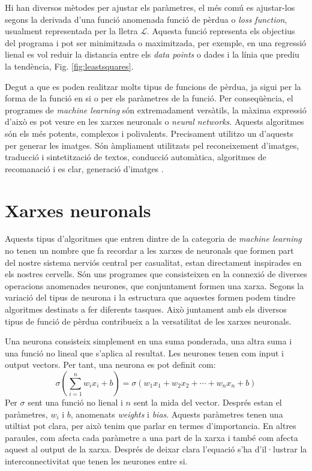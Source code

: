 Hi han diversos mètodes per ajustar els paràmetres, el més comú es ajustar-los segons la derivada d'una funció anomenada funció de pèrdua o \textit{loss function}, usualment representada per la lletra $\mathcal{L}$. Aquesta funció representa els objectius del programa i pot ser minimitzada o maximitzada, per exemple, en una regressió lienal es vol reduir la distancia entre els \textit{data points} o dades i la línia que prediu la tendència, Fig. \ref{fig:leastsquares}. 

Degut a que es poden realitzar molts tipus de funcions de pèrdua, ja sigui per la forma de la funció en si o per els paràmetres de la funció. Per conseqüència, el programes de \textit{machine learning} són extremadament versàtils, la màxima expressió d'això es pot veure en les xarxes neuronals o \textit{neural networks}. Aquests algoritmes són els més potents, complexos i polivalents. Precisament utilitzo un d'aquests per generar les imatges. Són àmpliament utilitzats pel reconeixement d'imatges, traducció i sintetització de textos, conducció automàtica, algoritmes de recomanació i es clar, generació d'imatges \tocite. 

\section{Xarxes neuronals}
Aquests tipus d'algoritmes que entren dintre de la categoria de \textit{machine learning} no tenen un nombre que fa recordar a les xarxes de neuronals que formen part del nostre sistema nerviós central per casualitat, estan directament inspirades en els nostres cervells. Són uns programes que consisteixen en la connexió de diverses operacions anomenades neurones, que conjuntament formen una xarxa. Segons la variació del tipus de neurona i la estructura que aquestes formen podem tindre algoritmes destinats a fer diferents tasques. Això juntament amb els diversos tipus de funció de pèrdua contribueix a la versatilitat de les xarxes neuronals. 

Una neurona consisteix simplement en una suma ponderada, una altra suma i una funció no lineal que s'aplica al resultat. Les neurones tenen com input i output vectors. Per tant, una neurona es pot definit com:
$$
\sigma \left(\sum_{i=1}^n w_i x_i + b\right) = \sigma \left( w_1x_1 + w_2x_2 + \cdots + w_nx_n + b 
\right) 
$$
Per $\sigma$ sent una funció no lienal i $n$ sent la mida del vector. Després estan el paràmetres, $w_i$ i $b$, anomenats \textit{weights} i \textit{bias}. 
Aquests paràmetres tenen una utiltiat pot clara, per això tenim que parlar en termes d'importancia. En altres paraules, com afecta cada paràmetre a una part de la xarxa i també com afecta aquest al output de la xarxa. Després de deixar clara l'equació s'ha d'il·lustrar la interconnectivitat que tenen les neurones entre si. 

